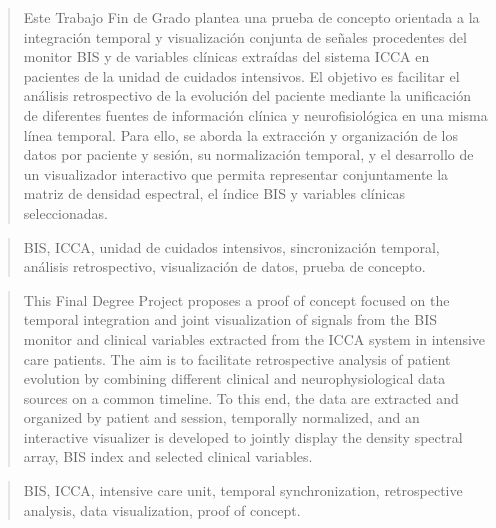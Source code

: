 \documentclass[
  spanish,
  a4paper,
  12pt,
  twoside]{memoir}
\begin{document}
\vfill
\newpage\null\thispagestyle{empty}\newpage

\frontmatter

\pagestyle{chapterfirst}

\renewcommand*\abstractname{Resumen}
\begin{abstract}
Este Trabajo Fin de Grado plantea una prueba de concepto orientada a la integración temporal y visualización conjunta de señales procedentes del monitor BIS y de variables clínicas extraídas del sistema ICCA en pacientes de la unidad de cuidados intensivos. El objetivo es facilitar el análisis retrospectivo de la evolución del paciente mediante la unificación de diferentes fuentes de información clínica y neurofisiológica en una misma línea temporal. Para ello, se aborda la extracción y organización de los datos por paciente y sesión, su normalización temporal, y el desarrollo de un visualizador interactivo que permita representar conjuntamente la matriz de densidad espectral, el índice BIS y variables clínicas seleccionadas.
\end{abstract}

\renewcommand*\abstractname{Descriptores}
\begin{abstract}
BIS, ICCA, unidad de cuidados intensivos, sincronización temporal, análisis retrospectivo, visualización de datos, prueba de concepto.
\end{abstract}

\clearpage

\renewcommand*\abstractname{Abstract}
\begin{abstract}
This Final Degree Project proposes a proof of concept focused on the temporal integration and joint visualization of signals from the BIS monitor and clinical variables extracted from the ICCA system in intensive care patients. The aim is to facilitate retrospective analysis of patient evolution by combining different clinical and neurophysiological data sources on a common timeline. To this end, the data are extracted and organized by patient and session, temporally normalized, and an interactive visualizer is developed to jointly display the density spectral array, BIS index and selected clinical variables.
\end{abstract}

\renewcommand*\abstractname{Keywords}
\begin{abstract}
BIS, ICCA, intensive care unit, temporal synchronization, retrospective analysis, data visualization, proof of concept.
\end{abstract}
\end{document}
